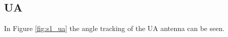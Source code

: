\subsection{UA}
In Figure \ref{fig:s1_ua} the angle tracking of the UA antenna can be seen.

\begin{figure}[H]
	\hfill
	\hfill
	\hfill
	\\
	\hfill

\end{figure}
